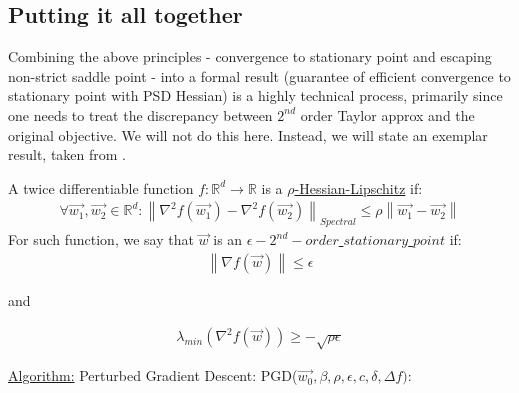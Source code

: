 \documentclass[12pt]{article}
\newcommand{\norm}[1]{\left\| #1 \right\|}
\begin{document}
	\subsection{Putting it all together}
	Combining the above principles - convergence to stationary point and escaping non-strict saddle point - into a formal result (guarantee of efficient convergence to stationary point with PSD Hessian) is a highly technical process, primarily since one needs to treat the discrepancy between ${2}^{nd}$ order Taylor approx and the original objective. We will not do this here. Instead, we will state an exemplar result, taken from \cite{avoid-saddle-point}.

    \begin{definition}
	\label{def:rho Hessian Lipschitz}				
		A twice differentiable function $f:\mathbb{R}^d\to\mathbb{R}$ is a  \underline{$\rho$-Hessian-Lipschitz} if:
		\begin{align*}
		    \forall\overrightarrow{w_1},\overrightarrow{w_2}\in\mathbb{R}^d:\norm{{{\nabla}^{2}}{f(\overrightarrow{w_1})}-{{\nabla}^{2}}{f(\overrightarrow{w_2})}}_{Spectral}
		    \leq
		    \rho\norm{\overrightarrow{w_1}-\overrightarrow{w_2}}
	    \end{align*}
	    For such function, we say that $\overrightarrow{w}$ is an \underline{$\epsilon-{{2}^{nd}}-order$ $stationary$ $point$} if:
	    \begin{align*}
		    \norm{{\nabla}{f(\overrightarrow{w})}} \leq \epsilon
	    \end{align*}
        \centerline{and}
	    \begin{align*}
            {\lambda_{min}}({{\nabla}^{2}}{f(\overrightarrow{w})}) 
		    \geq -\sqrt{\rho\epsilon}
	    \end{align*}
	\end{definition}
	\newpage
	\noindent\underline{Algorithm:}
	Perturbed Gradient Descent: PGD($\overrightarrow{w_0}, \beta, \rho, \epsilon, c, \delta, \Delta{f}):$
\end{document}
